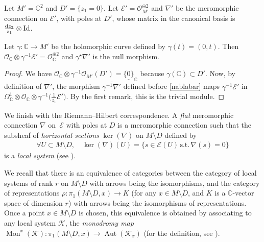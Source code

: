 \documentclass[10pt,a4paper]{amsart}
\numberwithin{equation}{section}
\begin{document}
\begin{Exemple}\label{exemplegeodesicisotrope} Let $M'=\mathbb{C}^2$ and $D'=\{z_1=0\}$. Let $\mathcal{E}'=\mathcal{O}_{M'}^{\oplus 2}$ and $\nabla'$ be the meromorphic connection on $\mathcal{E}'$, with poles at $D'$, whose matrix in the canonical basis is $\frac{{\rm d}z_2}{z_1} \otimes {\rm Id}$.

Let $\gamma\colon \mathbb{C} \longrightarrow M'$ be the holomorphic curve defined by $\gamma(t)=(0,t)$. Then $\mathcal{O}_\mathbb{C} \otimes \gamma^{-1}\mathcal{E}'= \mathcal{O}_\mathbb{C}^{\oplus 2}$ and $\gamma^\star \nabla'$ is the null morphism. \end{Exemple}
\begin{proof} We have $\mathcal{O}_\mathbb{C} \otimes \gamma^{-1} \mathcal{O}_{M'}(D') = \underline{\{0\}}_{\mathbb{C}}$ because $\gamma(\mathbb{C})\subset D'$. Now, by definition of $\nabla'$, the morphism $\overline{\gamma^{-1}\nabla'}$ defined before \eqref{nablabar} maps $\gamma^{-1}\mathcal{E}'$ in $\Omega_\mathbb{C}^1 \otimes \mathcal{O}_\mathbb{C} \otimes \gamma^{-1}\big(\frac{1}{z_1} \mathcal{E}'\big)$. By the first remark, this is the trivial module. \end{proof}

We finish with the Riemann--Hilbert correspondence. A \textit{flat} meromorphic connection $\nabla$ on~$\mathcal{E}$ with poles at $D$ is a meromorphic connection such that the subsheaf of \textit{horizontal sections} $\ker(\nabla)$ on $M\setminus D$ defined by
\begin{gather*}%
 \forall U\subset M\setminus D,\quad \ker(\nabla)(U) = \{ s\in \mathcal{E}(U)\, \text{s.t.}\, \nabla(s)=0\} \end{gather*}
 is a \textit{local system} (see \cite[Chapter~I, Theorem~2.17]{Deligne}).

We recall \cite[Chapter~I,  Theorem~2.17]{Deligne} that there is an equivalence of categories between the category of local systems of rank $r$ on $M\setminus D$ with arrows being the isomorphisms, and the category of representations $\rho \colon \pi_1(M\setminus D,x) \longrightarrow K$ (for any $x\in M\setminus D$, and $K$ is a $\mathbb{C}$-vector space of dimension $r$) with arrows being the isomorphisms of representations. Once a point $x\in M\setminus D$ is chosen, this equivalence is obtained by associating to any local system $\mathcal{K}$, the \textit{monodromy map} $\operatorname{Mon}^x(\mathcal{K})\colon \pi_1(M\setminus D,x) \longrightarrow \operatorname{Aut}(\mathcal{K}_x)$ (for the definition, see \cite[Chapter~I, Section~1.2]{Deligne}).
\end{document}
